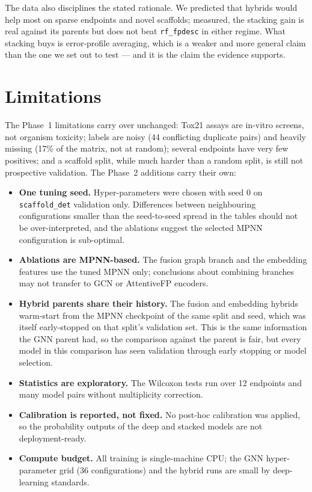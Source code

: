 \documentclass[conference]{IEEEtran}
\newcommand{\code}[1]{\texttt{\small #1}}
\begin{document}
The data also disciplines the stated rationale. We predicted that hybrids would help most on
sparse endpoints and novel scaffolds; measured, the stacking gain is real against its parents
but does not beat \code{rf\_fpdesc} in either regime. What stacking buys is error-profile
averaging, which is a weaker and more general claim than the one we set out to test --- and it
is the claim the evidence supports.

\section{Limitations}
The Phase~1 limitations carry over unchanged: Tox21 assays are in-vitro screens, not organism
toxicity; labels are noisy (44 conflicting duplicate pairs) and heavily missing (17\% of the
matrix, not at random); several endpoints have very few positives; and a scaffold split, while
much harder than a random split, is still not prospective validation. The Phase~2 additions
carry their own:

\begin{itemize}
\item \textbf{One tuning seed.} Hyper-parameters were chosen with seed 0 on \code{scaffold\_det}
validation only. Differences between neighbouring configurations smaller than the seed-to-seed
spread in the tables should not be over-interpreted, and the ablations suggest the selected MPNN
configuration is sub-optimal.
\item \textbf{Ablations are MPNN-based.} The fusion graph branch and the embedding features use
the tuned MPNN only; conclusions about combining branches may not transfer to GCN or
AttentiveFP encoders.
\item \textbf{Hybrid parents share their history.} The fusion and embedding hybrids warm-start
from the MPNN checkpoint of the same split and seed, which was itself early-stopped on that
split's validation set. This is the same information the GNN parent had, so the comparison
against the parent is fair, but every model in this comparison has seen validation through early
stopping or model selection.
\item \textbf{Statistics are exploratory.} The Wilcoxon tests run over 12 endpoints and many
model pairs without multiplicity correction.
\item \textbf{Calibration is reported, not fixed.} No post-hoc calibration was applied, so the
probability outputs of the deep and stacked models are not deployment-ready.
\item \textbf{Compute budget.} All training is single-machine CPU; the GNN hyper-parameter grid
(36 configurations) and the hybrid runs are small by deep-learning standards.
\end{itemize}
\end{document}
